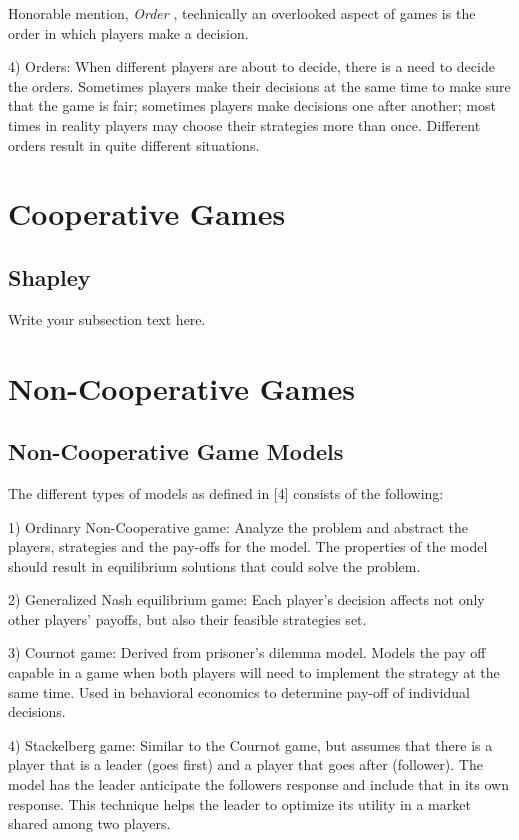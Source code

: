 Honorable mention, \textit{Order} , technically an overlooked aspect of 
games is the order in which players make a decision. 

4) Orders:  When  different  players  are  about  to  decide,  
there is a need to decide the orders. Sometimes players make 
their decisions at the same time to make sure that the game is fair;  
sometimes  players  make  decisions  one  after  another;  most times 
in reality players may choose their strategies more than once.  
Different orders result in quite different situations.

\section{Cooperative Games}

\subsection{Shapley}
Write your subsection text here.

\section{Non-Cooperative Games}

\subsection{Non-Cooperative Game Models}

The different types of models as defined in [4] consists of the following:

1) Ordinary Non-Cooperative game: Analyze the problem and abstract the players,
strategies and the pay-offs for the model. The properties of the model should 
result in equilibrium solutions that could solve the problem.

2) Generalized Nash equilibrium game: Each  player’s  decision affects 
not only other players’ payoffs, but also their feasible strategies set.

3) Cournot game: Derived from prisoner's dilemma model. Models the pay off  
capable in a game when both players will need to implement the strategy at the
same time. Used in behavioral economics to determine pay-off of individual decisions.

4) Stackelberg game: Similar to the Cournot game, but assumes that there is a 
player that is a leader (goes first) and a player that goes after (follower).
The model has the leader anticipate the followers response and include that 
in its own response. This technique helps the leader to optimize its utility
in a market shared among two players.

